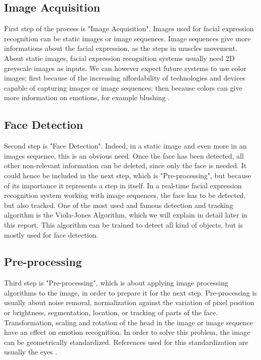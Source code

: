 \subsection{Image Acquisition}

\vspace{\baselineskip}
\noindent First step of the process is "Image Acquisition". Images used for facial expression recognition can be static images or image sequences. Image sequences give more informations about the facial expression, as the steps in muscles movement. About static images, facial expression recognition systems usually need 2D greyscale images as inputs. We can however expect future systems to use color images; first because of the increasing affordability of technologies and devices capable of capturing images or image sequences; then because colors can give more information on emotions, for example blushing \cite{CHI03}.
\newline

\subsection{Face Detection}

\vspace{\baselineskip}
\noindent Second step is "Face Detection". Indeed, in a static image and even more in an images sequence, this is an obvious need. Once the face has been detected, all other non-relevant information can be deleted, since only the face is needed. It could hence be included in the next step, which is "Pre-processing", but because of its importance it represents a step in itself. In a real-time facial expression recognition system working with image sequences, the face has to be detected, but also tracked. One of the most used and famous detection and tracking algorithm is the Viola-Jones Algorithm, which we will explain in detail later in this report. This algorithm can be trained to detect all kind of objects, but is mostly used for face detection. 
\newline

\subsection{Pre-processing}

\vspace{\baselineskip}
\noindent Third step is "Pre-processing", which is about applying image processing algorithms to the image, in order to prepare it for the next step. Pre-processing is usually about noise removal, normalization against the variation of pixel position or brightness, segmentation, location, or tracking of parts of the face. Transformation, scaling and rotation of the head in the image or image sequence have an effect on emotion recognition. In order to solve this problem, the image can be geometrically standardized. References used for this standardization are usually the eyes \cite{CHI03}.
\newline

